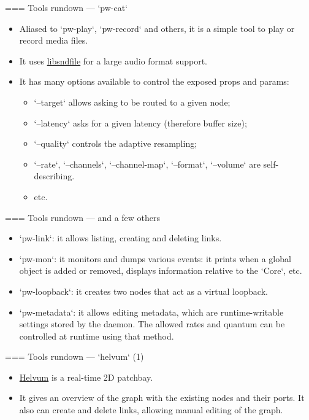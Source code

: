 === {Tools rundown — `pw-cat`}
  \begin{itemize}

  \item Aliased to `pw-play`, `pw-record` and others, it is a
    simple tool to play or record media files.

  \item It uses \href{https://libsndfile.github.io/libsndfile/}{libsndfile}
    for a large audio format support.

  \item It has many options available to control the exposed props and
    params:

    \begin{itemize}
    \item `--target` allows asking to be routed to a given node;
    \item `--latency` asks for a given latency (therefore buffer size);
    \item `--quality` controls the adaptive resampling;
    \item `--rate`, `--channels`, `--channel-map`,
      `--format`, `--volume` are self-describing.
    \item etc.
    \end{itemize}

  \end{itemize}




=== {Tools rundown — and a few others}
  \begin{itemize}

  \item `pw-link`: it allows listing, creating and deleting links.

  \item `pw-mon`: it monitors and dumps various events: it prints
    when a global object is added or removed, displays information
    relative to the `Core`, etc.

  \item `pw-loopback`: it creates two nodes that act as a virtual
    loopback.

  \item `pw-metadata`: it allows editing metadata, which are
    runtime-writable settings stored by the daemon. The allowed rates
    and quantum can be controlled at runtime using that method.

  \end{itemize}




=== {Tools rundown — `helvum` (1)}
  \begin{itemize}

  \item \href{https://gitlab.freedesktop.org/pipewire/helvum}{Helvum}
    is a real-time 2D patchbay.

  \item It gives an overview of the graph with the existing nodes and
    their ports. It also can create and delete links, allowing manual
    editing of the graph.

  \end{itemize}

